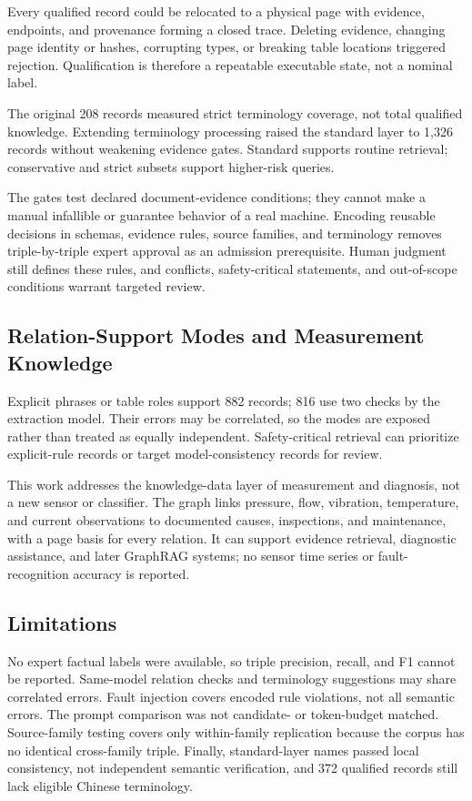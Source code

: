 \documentclass[conference,a4paper]{IEEEtran}
\begin{document}
Every qualified record could be relocated to a physical page with evidence, endpoints, and provenance forming a closed trace. Deleting evidence, changing page identity or hashes, corrupting types, or breaking table locations triggered rejection. Qualification is therefore a repeatable executable state, not a nominal label.

The original 208 records measured strict terminology coverage, not total qualified knowledge. Extending terminology processing raised the standard layer to 1,326 records without weakening evidence gates. Standard supports routine retrieval; conservative and strict subsets support higher-risk queries.

The gates test declared document-evidence conditions; they cannot make a manual infallible or guarantee behavior of a real machine. Encoding reusable decisions in schemas, evidence rules, source families, and terminology removes triple-by-triple expert approval as an admission prerequisite. Human judgment still defines these rules, and conflicts, safety-critical statements, and out-of-scope conditions warrant targeted review.

\subsection{Relation-Support Modes and Measurement Knowledge}

Explicit phrases or table roles support 882 records; 816 use two checks by the extraction model. Their errors may be correlated, so the modes are exposed rather than treated as equally independent. Safety-critical retrieval can prioritize explicit-rule records or target model-consistency records for review.

This work addresses the knowledge-data layer of measurement and diagnosis, not a new sensor or classifier. The graph links pressure, flow, vibration, temperature, and current observations to documented causes, inspections, and maintenance, with a page basis for every relation. It can support evidence retrieval, diagnostic assistance, and later GraphRAG systems; no sensor time series or fault-recognition accuracy is reported.

\subsection{Limitations}

No expert factual labels were available, so triple precision, recall, and F1 cannot be reported. Same-model relation checks and terminology suggestions may share correlated errors. Fault injection covers encoded rule violations, not all semantic errors. The prompt comparison was not candidate- or token-budget matched. Source-family testing covers only within-family replication because the corpus has no identical cross-family triple. Finally, standard-layer names passed local consistency, not independent semantic verification, and 372 qualified records still lack eligible Chinese terminology.
\end{document}
